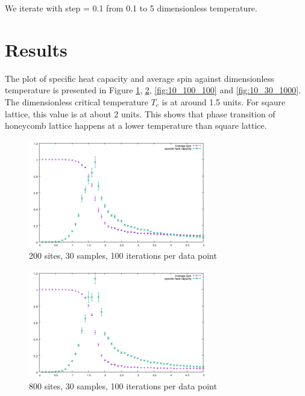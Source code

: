 \documentclass{article}
\begin{document}
We iterate with step = 0.1 from 0.1 to 5 dimensionless temperature.

\section{Results}
\label{sec-3}

The plot of specific heat capacity and average spin against
dimensionless temperature is presented in Figure
\ref{fig:10_30_100}, \ref{fig:20_30_100}, \ref{fig:10_100_100}
and \ref{fig:10_30_1000}. The dimensionless critical temperature
$T_c$ is at around 1.5 units. For sqaure lattice, this value is at
about 2 units. This shows that phase transition of honeycomb lattice
happens at a lower temperature than square lattice.

\begin{figure}[H]
  \centering
  \includegraphics[width = 0.7\textwidth]{figures/200_sites_100_iterations_30_samples.png}
  \caption{200 sites, 30 samples, 100 iterations per data point}
  \label{fig:10_30_100}
\end{figure}

\begin{figure}[H]
  \centering
  \includegraphics[width = 0.7\textwidth]{figures/800_sites_100_iterations_30_samples.png}
  \caption{800 sites, 30 samples, 100 iterations per data point}
  \label{fig:20_30_100}
\end{figure}
\end{document}
